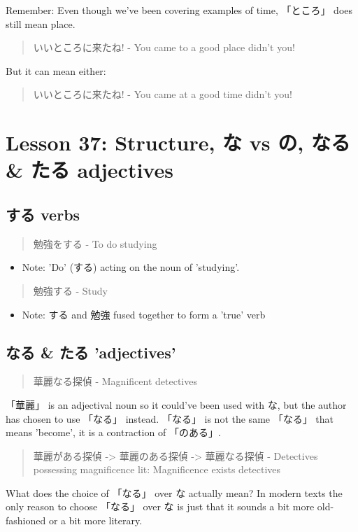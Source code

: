 \documentclass[11pt]{article}
\begin{document}
Remember: Even though we've been covering examples of time, 「ところ」 does still mean place.
\begin{quote}
いいところに来たね! - You came to a good place didn't you!
\end{quote}
But it can mean either:
\begin{quote}
いいところに来たね! - You came at a good time didn't you!
\end{quote}
\section{Lesson 37: Structure, な vs の, なる \& たる adjectives}
\label{sec:orgeceab05}
\subsection{する verbs}
\label{sec:org7dcb911}
\begin{quote}
勉強をする - To do studying
\end{quote}
\begin{itemize}
\item Note: 'Do' (する) acting on the noun of 'studying'.
\end{itemize}
\begin{quote}
勉強する - Study
\end{quote}
\begin{itemize}
\item Note: する and 勉強 fused together to form a 'true' verb
\end{itemize}

\subsection{なる \& たる 'adjectives'}
\label{sec:orge6c677b}
\begin{quote}
華麗なる探偵 - Magnificent detectives
\end{quote}
「華麗」 is an adjectival noun so it could've been used with な, but the author has chosen to use 「なる」 instead. 「なる」 is not the same 「なる」 that means 'become', it is a contraction of 「のある」.

\begin{quote}
華麗がある探偵 -> 華麗のある探偵 -> 華麗なる探偵 - Detectives possessing magnificence lit: Magnificence exists detectives
\end{quote}
What does the choice of 「なる」 over な actually mean? In modern texts the only reason to choose 「なる」 over な is just that it sounds a bit more old-fashioned or a bit more literary.
\end{document}
